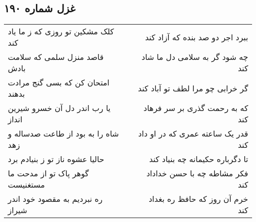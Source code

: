 \begin{center}
\section*{غزل شماره ۱۹۰}
\label{sec:sh190}
\begin{longtable}{l p{0.5cm} r}
کلک مشکین تو روزی که ز ما یاد کند
&&
ببرد اجر دو صد بنده که آزاد کند
\\
قاصد منزل سلمی که سلامت بادش
&&
چه شود گر به سلامی دل ما شاد کند
\\
امتحان کن که بسی گنج مرادت بدهند
&&
گر خرابی چو مرا لطف تو آباد کند
\\
یا رب اندر دل آن خسرو شیرین انداز
&&
که به رحمت گذری بر سر فرهاد کند
\\
شاه را به بود از طاعت صدساله و زهد
&&
قدر یک ساعته عمری که در او داد کند
\\
حالیا عشوه ناز تو ز بنیادم برد
&&
تا دگرباره حکیمانه چه بنیاد کند
\\
گوهر پاک تو از مدحت ما مستغنیست
&&
فکر مشاطه چه با حسن خداداد کند
\\
ره نبردیم به مقصود خود اندر شیراز
&&
خرم آن روز که حافظ ره بغداد کند
\\
\end{longtable}
\end{center}
